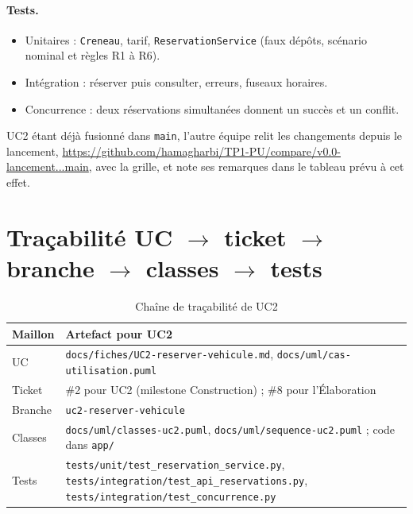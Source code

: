\documentclass[11pt,a4paper]{article}
\begin{document}
\paragraph{Tests.}
\begin{itemize}
  \item Unitaires : \texttt{Creneau}, tarif, \texttt{ReservationService} (faux
        dépôts, scénario nominal et règles R1 à R6).
  \item Intégration : réserver puis consulter, erreurs, fuseaux horaires.
  \item Concurrence : deux réservations simultanées donnent un succès et un conflit.
\end{itemize}

\noindent UC2 étant déjà fusionné dans \texttt{main}, l'autre équipe relit les
changements depuis le lancement,
\url{https://github.com/hamagharbi/TP1-PU/compare/v0.0-lancement...main}, avec la
grille, et note ses remarques dans le tableau prévu à cet effet.

\section{\texorpdfstring{Traçabilité UC $\rightarrow$ ticket $\rightarrow$ branche $\rightarrow$ classes $\rightarrow$ tests}{Traçabilité UC, ticket, branche, classes, tests}}

\begin{table}[H]
\centering
\begin{tabularx}{\textwidth}{l L}
\toprule
\textbf{Maillon} & \textbf{Artefact pour UC2} \\
\midrule
UC & \texttt{docs/fiches/UC2-reserver-vehicule.md}, \texttt{docs/uml/cas-utilisation.puml} \\
Ticket & \#2 pour UC2 (milestone Construction) ; \#8 pour l'Élaboration \\
Branche & \texttt{uc2-reserver-vehicule} \\
Classes & \texttt{docs/uml/classes-uc2.puml}, \texttt{docs/uml/sequence-uc2.puml} ; code dans \texttt{app/} \\
Tests & \texttt{tests/unit/test\_reservation\_service.py}, \texttt{tests/integration/test\_api\_reservations.py}, \texttt{tests/integration/test\_concurrence.py} \\
\bottomrule
\end{tabularx}
\caption{Chaîne de traçabilité de UC2}
\end{table}
\end{document}
